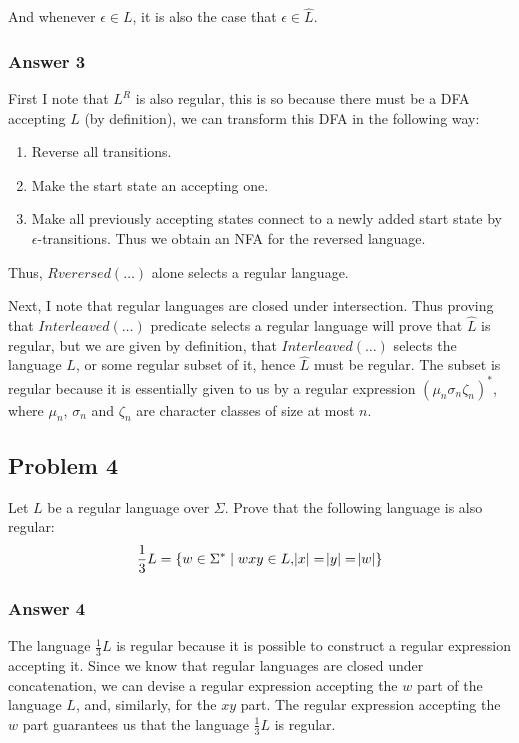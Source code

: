 \documentclass[11pt]{article}
\begin{document}
And whenever \(\epsilon \in L\), it is also the case that \(\epsilon \in \hat{L}\).

\subsubsection{Answer 3}
\label{sec:orgheadline5}
First I note that \(L^R\) is also regular, this is so because there must be a
DFA accepting \(L\) (by definition), we can transform this DFA in the following way:
\begin{enumerate}
\item Reverse all transitions.
\item Make the start state an accepting one.
\item Make all previously accepting states connect to a newly added start state by
\(\epsilon\)-transitions.  Thus we obtain an NFA for the reversed language.
\end{enumerate}

Thus, \(Rverersed(\dots)\) alone selects a regular language.

Next, I note that regular languages are closed under intersection.  Thus
proving that \(Interleaved(\dots)\) predicate selects a regular language will
prove that \(\hat{L}\) is regular, but we are given by definition, that
\(Interleaved(\dots)\) selects the language \(L\), or some regular subset of it,
hence \(\hat{L}\) must be regular.  The subset is regular because it is
essentially given to us by a regular expression \((\mu_n \sigma_n
    \zeta_n)^*\), where \(\mu_n\), \(\sigma_n\) and \(\zeta_n\) are character classes
of size at most \(n\).

\subsection{Problem 4}
\label{sec:orgheadline8}
Let \(L\) be a regular language over \(\Sigma\).  Prove that the following
language is also regular:
\begin{align*}
  \frac{1}{3}L = \{ w \in \Sigma^* \;|\; wxy \in L, \abs{x} = \abs{y} = \abs{w} \}
\end{align*}

\subsubsection{Answer 4}
\label{sec:orgheadline7}
The language \(\frac{1}{3}L\) is regular because it is possible to construct a
regular expression accepting it.  Since we know that regular languages are
closed under concatenation, we can devise a regular expression accepting the
\(w\) part of the language \(L\), and, similarly, for the \(xy\) part.  The
regular expression accepting the \(w\) part guarantees us that the language
\(\frac{1}{3}L\) is regular.
\end{document}
